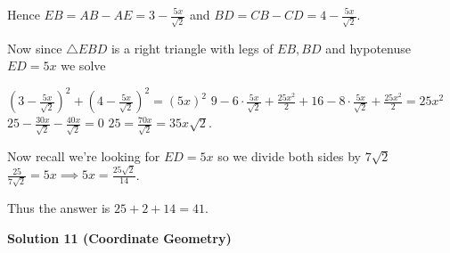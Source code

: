 \begin{enumerate}
 Hence $EB = AB - AE = 3 - \frac{5x}{\sqrt{2}}$ and $BD = CB - CD = 4 - \frac{5x}{\sqrt{2}}$. 

 Now since $\triangle EBD$ is a right triangle with legs of $EB, BD$ and hypotenuse $ED = 5x$ we solve

 $(3 - \frac{5x}{\sqrt{2}})^{2} + (4 - \frac{5x}{\sqrt{2}})^{2} = (5x)^{2}$
$9 - 6 \cdot \frac{5x}{\sqrt{2}} + \frac{25x^{2}}{2} + 16 - 8 \cdot \frac{5x}{\sqrt{2}} + \frac{25x^{2}}{2} = 25x^{2}$
$25 - \frac{30x}{\sqrt{2}} - \frac{40x}{\sqrt{2}} = 0$
$25 = \frac{70x}{\sqrt{2}} = 35x\sqrt{2}$. 

 Now recall we're looking for $ED = 5x$ so we divide both sides by $7\sqrt{2}$
$\frac{25}{7\sqrt{2}} = 5x \implies 5x = \frac{25\sqrt{2}}{14}$.

 Thus the answer is $25 + 2 + 14 = \boxed{41}$. 

 



\textbf{Solution 11 (Coordinate Geometry)}


\end{enumerate}
